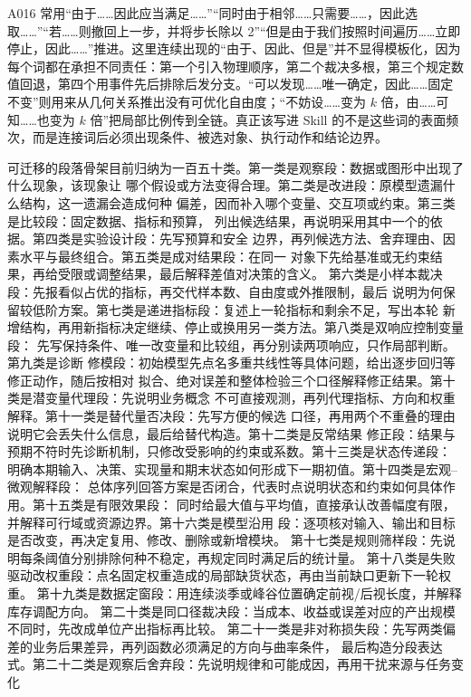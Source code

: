 \documentclass[UTF8,a4paper,12pt]{ctexart}
\begin{document}
A016 常用“由于……因此应当满足……”“同时由于相邻……只需要……，因此选取……”“若……则撤回上一步，并将步长除以 2”“但是由于我们按照时间遍历……立即停止，因此……”推进。这里连续出现的“由于、因此、但是”并不显得模板化，因为每个词都在承担不同责任：第一个引入物理顺序，第二个裁决多根，第三个规定数值回退，第四个用事件先后排除后发分支。“可以发现……唯一确定，因此……固定不变”则用来从几何关系推出没有可优化自由度；“不妨设……变为 $k$ 倍，由……可知……也变为 $k$ 倍”把局部比例传到全链。真正该写进 Skill 的不是这些词的表面频次，而是连接词后必须出现条件、被选对象、执行动作和结论边界。

可迁移的段落骨架目前归纳为一百五十类。第一类是观察段：数据或图形中出现了什么现象，该现象让
哪个假设或方法变得合理。第二类是改进段：原模型遗漏什么结构，这一遗漏会造成何种
偏差，因而补入哪个变量、交互项或约束。第三类是比较段：固定数据、指标和预算，
列出候选结果，再说明采用其中一个的依据。第四类是实验设计段：先写预算和安全
边界，再列候选方法、舍弃理由、因素水平与最终组合。第五类是成对结果段：在同一
对象下先给基准或无约束结果，再给受限或调整结果，最后解释差值对决策的含义。
第六类是小样本裁决段：先报看似占优的指标，再交代样本数、自由度或外推限制，最后
说明为何保留较低阶方案。第七类是递进指标段：复述上一轮指标和剩余不足，写出本轮
新增结构，再用新指标决定继续、停止或换用另一类方法。第八类是双响应控制变量段：
先写保持条件、唯一改变量和比较组，再分别读两项响应，只作局部判断。第九类是诊断
修模段：初始模型先点名多重共线性等具体问题，给出逐步回归等修正动作，随后按相对
拟合、绝对误差和整体检验三个口径解释修正结果。第十类是潜变量代理段：先说明业务概念
不可直接观测，再列代理指标、方向和权重解释。第十一类是替代量否决段：先写方便的候选
口径，再用两个不重叠的理由说明它会丢失什么信息，最后给替代构造。第十二类是反常结果
修正段：结果与预期不符时先诊断机制，只修改受影响的约束或系数。第十三类是状态传递段：
明确本期输入、决策、实现量和期末状态如何形成下一期初值。第十四类是宏观--微观解释段：
总体序列回答方案是否闭合，代表时点说明状态和约束如何具体作用。第十五类是有限效果段：
同时给最大值与平均值，直接承认改善幅度有限，并解释可行域或资源边界。第十六类是模型沿用
段：逐项核对输入、输出和目标是否改变，再决定复用、修改、删除或新增模块。
第十七类是规则筛样段：先说明每条阈值分别排除何种不稳定，再规定同时满足后的统计量。
第十八类是失败驱动改权重段：点名固定权重造成的局部缺货状态，再由当前缺口更新下一轮权重。
第十九类是数据定窗段：用连续淡季或峰谷位置确定前视/后视长度，并解释库存调配方向。
第二十类是同口径裁决段：当成本、收益或误差对应的产出规模不同时，先改成单位产出指标再比较。
第二十一类是非对称损失段：先写两类偏差的业务后果差异，再列函数必须满足的方向与曲率条件，
最后构造分段表达式。第二十二类是观察后舍弃段：先说明规律和可能成因，再用干扰来源与任务变化
\end{document}
